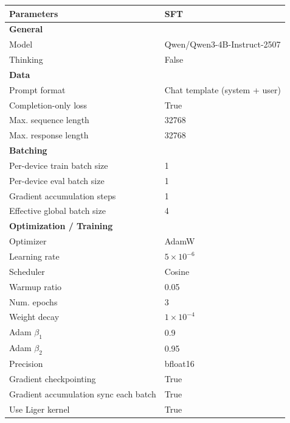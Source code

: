\begin{table}[h!]
\centering
\small
\setlength{\tabcolsep}{10pt}
\renewcommand{\arraystretch}{1.15}
\fontsize{8.5pt}{8.5pt}\selectfont
\begin{tabular}{p{5.5cm}p{7cm}}
\toprule
\textbf{Parameters} & \textbf{SFT} \\
\midrule

\textbf{General} & \\
Model & Qwen/Qwen3-4B-Instruct-2507 \\
Thinking & False \\

\midrule
\textbf{Data} & \\
Prompt format & Chat template (system + user) \\
Completion-only loss & True \\
Max. sequence length & 32768 \\
Max. response length & 32768 \\

\midrule
\textbf{Batching} & \\
Per-device train batch size & 1 \\
Per-device eval batch size & 1 \\
Gradient accumulation steps & 1 \\
Effective global batch size & 4 \\

\midrule
\textbf{Optimization / Training} & \\
Optimizer & AdamW \\
Learning rate & $5 \times 10^{-6}$ \\
Scheduler & Cosine \\
Warmup ratio & 0.05 \\
Num. epochs & 3 \\
Weight decay & $1 \times 10^{-4}$ \\
Adam $\beta_1$ & 0.9 \\
Adam $\beta_2$ & 0.95 \\
Precision & bfloat16 \\
Gradient checkpointing & True \\
Gradient accumulation sync each batch & True \\
Use Liger kernel & True \\


\end{tabular}
\end{table}
